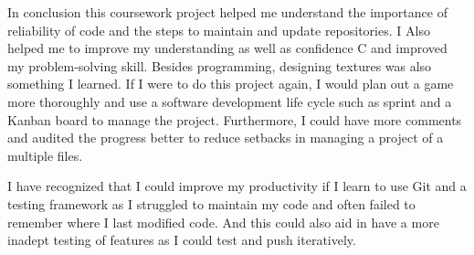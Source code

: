 
In conclusion this coursework project helped me understand the importance of reliability of code and the steps to maintain and update repositories. I Also helped me to improve my understanding as well as confidence C and improved my problem-solving skill. Besides programming, designing textures was also something I learned. If I were to do this project again, I would plan out a game more thoroughly and use a software development life cycle such as sprint and a Kanban board to manage the project. Furthermore, I could have more comments and audited the progress better to reduce setbacks in managing a project of a multiple files. 
\par
I have recognized that I could improve my productivity if I learn to use Git and a testing framework as I struggled to maintain my code and often failed to remember where I last modified code. And this could also aid in have a more inadept testing of features as I could test and push iteratively.
